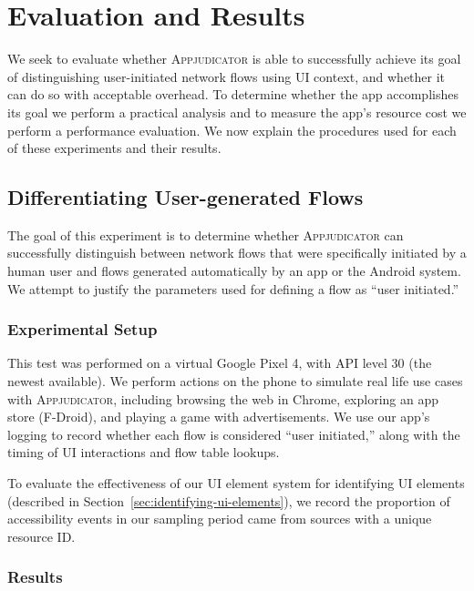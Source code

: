 \section{Evaluation and Results}
\label{sec:evaluation-and-results}

We seek to evaluate whether \textsc{Appjudicator} is able to successfully
achieve its goal of distinguishing user-initiated network flows using UI
context, and whether it can do so with acceptable overhead. To determine whether
the app accomplishes its goal we perform a practical analysis and to measure the
app's resource cost we perform a performance evaluation. We now explain the
procedures used for each of these experiments and their results.

\subsection{Differentiating User-generated Flows}
\label{sec:differentiating-user-generated-flows}

The goal of this experiment is to determine whether \textsc{Appjudicator} can
successfully distinguish between network flows that were specifically initiated
by a human user and flows generated automatically by an app or the Android
system. We attempt to justify the parameters used for defining a flow as ``user
initiated.''

\subsubsection{Experimental Setup}
\label{sec:experimental-setup}

This test was performed on a virtual Google Pixel 4, with API level 30 (the
newest available). We perform actions on the phone to simulate real life use
cases with \textsc{Appjudicator}, including browsing the web in Chrome,
exploring an app store (F-Droid), and playing a game with advertisements. We use
our app's logging to record whether each flow is considered ``user initiated,''
along with the timing of UI interactions and flow table lookups.

To evaluate the effectiveness of our UI element system for identifying UI
elements (described in Section~\ref{sec:identifying-ui-elements}), we record
the proportion of accessibility events in our sampling period came from sources
with a unique resource ID.

\subsubsection{Results}
\label{sec:practical-results}

